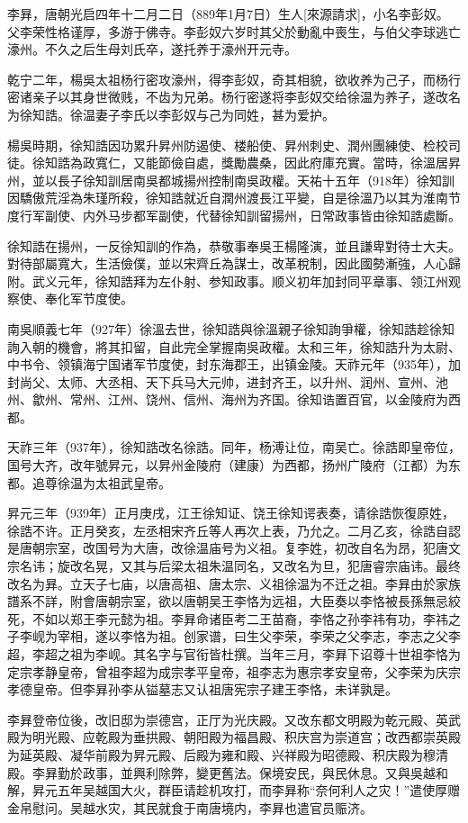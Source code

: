 李昪，唐朝光启四年十二月二日（889年1月7日）生人[來源請求]，小名李彭奴。父李荣性格谨厚，多游于佛寺。李彭奴六岁时其父於動亂中喪生，与伯父李球逃亡濠州。不久之后生母刘氏卒，遂托养于濠州开元寺。

乾宁二年，楊吳太祖杨行密攻濠州，得李彭奴，奇其相貌，欲收养为己子，而杨行密诸亲子以其身世微贱，不齿为兄弟。杨行密遂将李彭奴交给徐温为养子，遂改名为徐知誥。徐温妻子李氏以李彭奴与己为同姓，甚为爱护。

楊吳時期，徐知誥因功累升昇州防遏使、楼船使、昇州刺史、潤州團練使、检校司徒。徐知誥為政寬仁，又能節儉自處，獎勵農桑，因此府庫充實。當時，徐溫居昇州，並以長子徐知訓居南吳都城揚州控制南吳政權。天祐十五年（918年）徐知訓因驕傲荒淫為朱瑾所殺，徐知誥就近自潤州渡長江平變，自是徐溫乃以其为淮南节度行军副使、内外马步都军副使，代替徐知訓留揚州，日常政事皆由徐知誥處斷。

徐知誥在揚州，一反徐知訓的作為，恭敬事奉吳王楊隆演，並且謙卑對待士大夫。對待部屬寬大，生活儉僕，並以宋齊丘為謀士，改革稅制，因此國勢漸強，人心歸附。武义元年，徐知誥拜为左仆射、参知政事。顺义初年加封同平章事、领江州观察使、奉化军节度使。

南吳順義七年（927年）徐溫去世，徐知誥與徐溫親子徐知詢爭權，徐知誥趁徐知詢入朝的機會，將其扣留，自此完全掌握南吳政權。太和三年，徐知誥升为太尉、中书令、领镇海宁国诸军节度使，封东海郡王，出镇金陵。天祚元年（935年），加封尚父、太师、大丞相、天下兵马大元帅，进封齐王，以升州、润州、宣州、池州、歙州、常州、江州、饶州、信州、海州为齐国。徐知诰置百官，以金陵府为西都。

天祚三年（937年），徐知誥改名徐誥。同年，杨溥让位，南吴亡。徐誥即皇帝位，国号大齐，改年號昇元，以昇州金陵府（建康）为西都，扬州广陵府（江都）为东都。追尊徐温为太祖武皇帝。

昇元三年（939年）正月庚戌，江王徐知证、饶王徐知谔表奏，请徐誥恢復原姓，徐誥不许。正月癸亥，左丞相宋齐丘等人再次上表，乃允之。二月乙亥，徐誥自認是唐朝宗室，改国号为大唐，改徐温庙号为义祖。复李姓，初改自名为昂，犯唐文宗名讳；旋改名晃，又其与后梁太祖朱温同名，又改名为旦，犯唐睿宗庙讳。最终改名为昪。立天子七庙，以唐高祖、唐太宗、义祖徐温为不迁之祖。李昪由於家族譜系不詳，附會唐朝宗室，欲以唐朝吴王李恪为远祖，大臣奏以李恪被長孫無忌絞死，不如以郑王李元懿为祖。李昪命诸臣考二王苗裔，李恪之孙李祎有功，李祎之子李岘为宰相，遂以李恪为祖。创家谱，曰生父李荣，李荣之父李志，李志之父李超，李超之祖为李岘。其名字与官衔皆杜撰。当年三月，李昪下诏尊十世祖李恪为定宗孝静皇帝，曾祖李超为成宗孝平皇帝，祖李志为惠宗孝安皇帝，父李荣为庆宗孝德皇帝。但李昪孙李从镒墓志又认祖唐宪宗子建王李恪，未详孰是。

李昪登帝位後，改旧邸为崇德宫，正厅为光庆殿。又改东都文明殿为乾元殿、英武殿为明光殿、应乾殿为垂拱殿、朝阳殿为福昌殿、积庆宫为崇道宫；改西都崇英殿为延英殿、凝华前殿为昇元殿、后殿为雍和殿、兴祥殿为昭德殿、积庆殿为穆清殿。李昪勤於政事，並興利除弊，變更舊法。保境安民，與民休息。又與吳越和解，昇元五年吴越国大火，群臣请趁机攻打，而李昪称“奈何利人之灾！”遣使厚赠金帛慰问。吴越水灾，其民就食于南唐境内，李昪也遣官员赈济。

